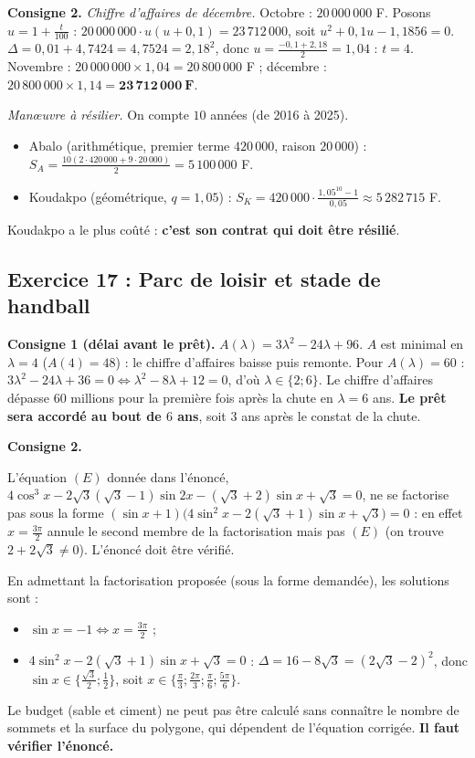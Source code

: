 \medskip\noindent\textbf{Consigne 2.}
\emph{Chiffre d'affaires de d\'ecembre.} Octobre : $20\,000\,000$ F. Posons $u=1+\frac{t}{100}$ :
$20\,000\,000\cdot u(u+0{,}1)=23\,712\,000$, soit $u^2+0{,}1u-1{,}1856=0$.
$\Delta=0{,}01+4{,}7424=4{,}7524=2{,}18^2$, donc $u=\frac{-0{,}1+2{,}18}{2}=1{,}04$ : $t=4$.
Novembre : $20\,000\,000\times1{,}04=20\,800\,000$ F ; d\'ecembre : $20\,800\,000\times1{,}14=\mathbf{23\,712\,000\ F}$.

\emph{Manœuvre \`a r\'esilier.} On compte $10$ ann\'ees (de 2016 \`a 2025).
\begin{itemize}
  \item Abalo (arithm\'etique, premier terme $420\,000$, raison $20\,000$) :
  $\displaystyle S_A=\frac{10(2\cdot420\,000+9\cdot20\,000)}{2}=5\,100\,000$ F.
  \item Koudakpo (g\'eom\'etrique, $q=1{,}05$) :
  $\displaystyle S_K=420\,000\cdot\frac{1{,}05^{10}-1}{0{,}05}\approx5\,282\,715$ F.
\end{itemize}
Koudakpo a le plus co\^ut\'e : \textbf{c'est son contrat qui doit \^etre r\'esili\'e}.

\subsection{Exercice 17 : Parc de loisir et stade de handball}

\textbf{Consigne 1 (d\'elai avant le pr\^et).} $A(\lambda)=3\lambda^2-24\lambda+96$.
$A$ est minimal en $\lambda=4$ ($A(4)=48$) : le chiffre d'affaires baisse puis remonte.
Pour $A(\lambda)=60$ : $3\lambda^2-24\lambda+36=0\iff\lambda^2-8\lambda+12=0$, d'o\`u $\lambda\in\{2;6\}$.
Le chiffre d'affaires d\'epasse $60$ millions pour la premi\`ere fois apr\`es la chute en $\lambda=6$ ans.
\textbf{Le pr\^et sera accord\'e au bout de $6$ ans}, soit $3$ ans apr\`es le constat de la chute.

\medskip\noindent\textbf{Consigne 2.}
\begin{rem} L'\'equation $(E)$ donn\'ee dans l'\'enonc\'e,
$4\cos^3x-2\sqrt3(\sqrt3-1)\sin2x-(\sqrt3+2)\sin x+\sqrt3=0$, ne se factorise pas sous la forme
$(\sin x+1)\bigl(4\sin^2x-2(\sqrt3+1)\sin x+\sqrt3\bigr)=0$ : en effet $x=\frac{3\pi}{2}$ annule le second membre
de la factorisation mais pas $(E)$ (on trouve $2+2\sqrt3\neq0$). L'\'enonc\'e doit \^etre v\'erifi\'e.
\end{rem}
En admettant la factorisation propos\'ee (sous la forme demand\'ee), les solutions sont :
\begin{itemize}
  \item $\sin x=-1\iff x=\frac{3\pi}{2}$ ;
  \item $4\sin^2x-2(\sqrt3+1)\sin x+\sqrt3=0$ : $\Delta=16-8\sqrt3=(2\sqrt3-2)^2$, donc $\sin x\in\{\frac{\sqrt3}{2};\frac12\}$,
  soit $x\in\{\frac{\pi}{3};\frac{2\pi}{3};\frac{\pi}{6};\frac{5\pi}{6}\}$.
\end{itemize}
Le budget (sable et ciment) ne peut pas \^etre calcul\'e sans conna\^itre le nombre de sommets et la surface du polygone,
qui d\'ependent de l'\'equation corrig\'ee. \textbf{Il faut v\'erifier l'\'enonc\'e.}

